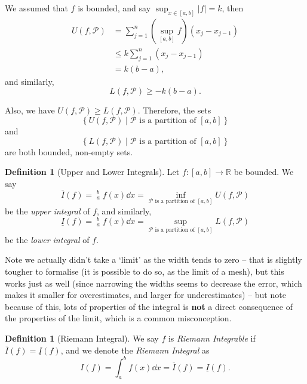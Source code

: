 \documentclass[11pt]{article}
\numberwithin{equation}{section}
\theoremstyle{definition}
\newtheorem{definition}[theorem]{Definition}
\theoremstyle{remark}
\newcommand{\pqty}[1]{\left(#1\right)}
\newcommand{\abs}[1]{\left|#1\right|}
\newcommand{\set}[2]{\left\{#1\mid #2\right\}}
\newcommand{\ccintv}[2]{[#1,#2]}
\newcommand{\functiondomain}[3]{#1:#2\to #3}
\newcommand{\RR}{\mathbb R}
\newcommand{\partition}{\mathcal P}
\newcommand{\upperSum}{U}
\newcommand{\lowerSum}{L}
\newcommand{\upperI}{\overline I}
\newcommand{\lowerI}{\underline I}
\newcommand{\upperInt}{\mathop{\overline{\int}}\nolimits}
\newcommand{\lowerInt}{\mathop{\underline{\int}}\nolimits}
\begin{document}
We assumed that \(f\) is bounded, and say \(\sup_{x \in \ccintv{a}{b}} \abs{f} = k\), then
\begin{align*}
    \upperSum\pqty{f, \partition} &= \sum_{j = 1}^{n} \pqty{\sup_{\ccintv{a}{b}} f} \pqty{x_j - x_{j - 1}} \\
    &\leq k \sum_{j = 1}^{n} \pqty{x_j - x_{j - 1}} \\
    &= k \pqty{b - a},
\end{align*}
and similarly,
\[
    \lowerSum\pqty{f, \partition} \geq -k \pqty{b - a}.
\]

Also, we have \(\upperSum\pqty{f, \partition} \geq \lowerSum\pqty{f, \partition}\). Therefore, the sets
\[
    \set{\upperSum\pqty{f, \partition}}{\partition \text{ is a partition of }\ccintv{a}{b}}
\]
and
\[
    \set{\lowerSum\pqty{f, \partition}}{\partition \text{ is a partition of }\ccintv{a}{b}}
\]
are both bounded, non-empty sets.

\begin{definition}[Upper and Lower Integrals]\label{analysis-unit-0140}
    \label{def:upper-lower-int}%
    Let \(\functiondomain{f}{\ccintv{a}{b}}{\RR}\) be bounded. We say
    \[
        \upperI \pqty{f} = \upperInt_{a}^{b} f \pqty{x} \dd{x} = \inf_{\partition\text{ is a partition of }\ccintv{a}{b}} \upperSum \pqty{f, \partition}
    \]
    be the \emph{upper integral} of \(f\), and similarly,
    \[
        \lowerI \pqty{f} = \lowerInt_{a}^{b} f \pqty{x} \dd{x} = \sup_{\partition\text{ is a partition of }\ccintv{a}{b}} \lowerSum \pqty{f, \partition}
    \]
    be the \emph{lower integral} of \(f\).
\end{definition}

Note we actually didn't take a `limit' as the width tends to zero -- that is slightly tougher to formalise (it is possible to do so, as the limit of a mesh), but this works just as well (since narrowing the widths seems to decrease the error, which makes it smaller for overestimates, and larger for underestimates) -- but note because of this, lots of properties of the integral is \textbf{not} a direct consequence of the properties of the limit, which is a common misconception.

\begin{definition}[Riemann Integral]\label{analysis-unit-0141}
    \label{def:riemann-integral}%
    We say \(f\) is \emph{Riemann Integrable} if \(\upperI \pqty{f} = \lowerI \pqty{f}\), and we denote the \emph{Riemann Integral} as
    \[
        I\pqty{f} = \int_{a}^{b} f\pqty{x} \dd{x} = \upperI\pqty{f} = \lowerI\pqty{f}.
    \]
\end{definition}
\end{document}
